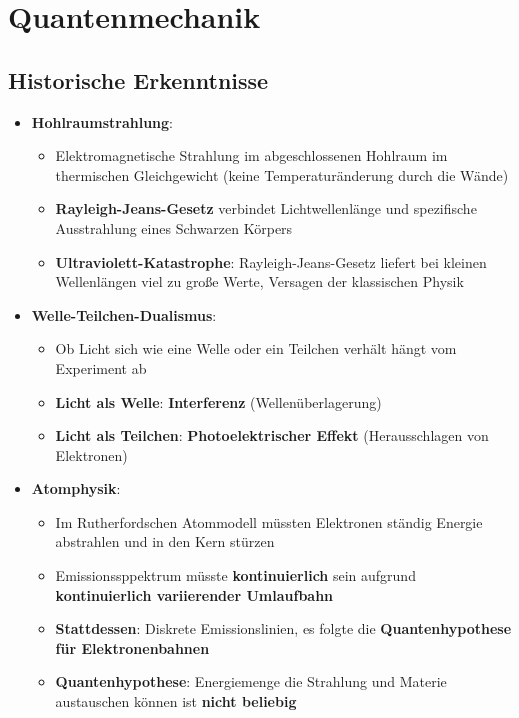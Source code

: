 \section{Quantenmechanik}%
\label{quant:sec:quantenmechanik}

\subsection{Historische Erkenntnisse}
\label{quant:sub:historische_erkenntnisse}

\begin{itemize}
	\item \textbf{Hohlraumstrahlung}:
	\begin{itemize}
		\item Elektromagnetische Strahlung im abgeschlossenen Hohlraum im thermischen Gleichgewicht (keine Temperaturänderung durch die Wände)
		\item \textbf{Rayleigh-Jeans-Gesetz} verbindet Lichtwellenlänge und spezifische Ausstrahlung eines Schwarzen Körpers
		\item \textbf{Ultraviolett-Katastrophe}: Rayleigh-Jeans-Gesetz liefert bei kleinen Wellenlängen viel zu große Werte, Versagen der klassischen Physik
	\end{itemize}
	\item \textbf{Welle-Teilchen-Dualismus}:
	\begin{itemize}
		\item Ob Licht sich wie eine Welle oder ein Teilchen verhält hängt vom Experiment ab
		\item \textbf{Licht als Welle}: \textbf{Interferenz} (Wellenüberlagerung)
		\item \textbf{Licht als Teilchen}: \textbf{Photoelektrischer Effekt} (Herausschlagen von Elektronen)
	\end{itemize}
	\item \textbf{Atomphysik}:
	\begin{itemize}
		\item Im Rutherfordschen Atommodell müssten Elektronen ständig Energie abstrahlen und in den Kern stürzen
		\item Emissionssppektrum müsste \textbf{kontinuierlich} sein aufgrund \textbf{kontinuierlich variierender Umlaufbahn}
		\item \textbf{Stattdessen}: Diskrete Emissionslinien, es folgte die \textbf{Quantenhypothese für Elektronenbahnen}
		\item \textbf{Quantenhypothese}: Energiemenge die Strahlung und Materie austauschen können ist \textbf{nicht beliebig}

\end{itemize}
\end{itemize}
